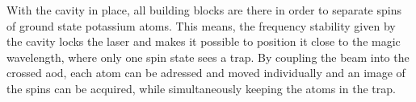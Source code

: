With the cavity in place, all building blocks are there in order to separate spins of ground state potassium atoms. This means, the frequency stability given by the cavity locks the laser and makes it possible to position it close to the magic wavelength, where only one spin state sees a trap. By coupling the beam into the crossed \ac{aod}, each atom can be adressed and moved individually and an image of the spins can be acquired, while simultaneously keeping the atoms in the trap.

\begin{figure}[t]%
\label{fig:cavity_drift}
\end{figure}
